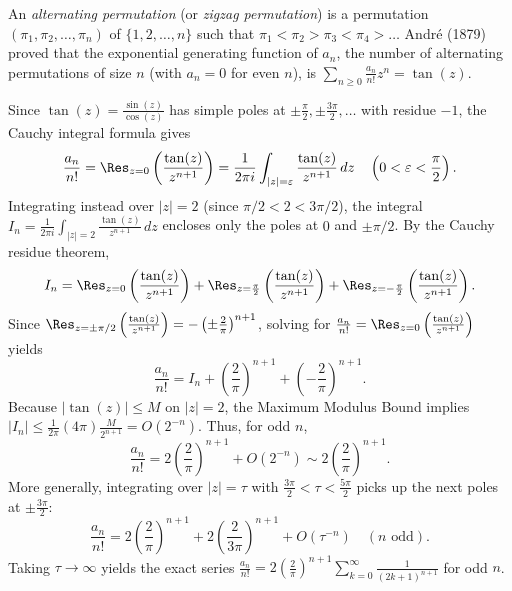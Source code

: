 \begin{example}
    An \emph{alternating permutation} (or \emph{zigzag permutation}) is a permutation \((\pi_1, \pi_2, \dots, \pi_n)\) of \(\{1, 2, \dots, n\}\) such that \(\pi_1 < \pi_2 > \pi_3 < \pi_4 > \dots\)
    André (1879) proved that the exponential generating function of \(a_n\), the number of alternating permutations of size \(n\) (with \(a_n = 0\) for even \(n\)), is \(\sum_{n \ge 0} \frac{a_n}{n!} z^n = \tan(z)\).

    Since \(\tan(z) = \frac{\sin(z)}{\cos(z)}\) has simple poles at \(\pm \frac{\pi}{2}, \pm \frac{3\pi}{2}, \dots\) with residue \(-1\), the Cauchy integral formula gives
    \[
        \frac{a_n}{n!} = \Res_{z=0}\left( \frac{\tan(z)}{z^{n+1}} \right) = \frac{1}{2\pi i} \int_{|z|=\varepsilon} \frac{\tan(z)}{z^{n+1}} \, dz \quad \left(0 < \varepsilon < \frac{\pi}{2}\right).
    \]
    Integrating instead over \(|z| = 2\) (since \(\pi/2 < 2 < 3\pi/2\)), the integral \(I_n = \frac{1}{2\pi i} \int_{|z|=2} \frac{\tan(z)}{z^{n+1}} \, dz\) encloses only the poles at \(0\) and \(\pm \pi/2\).
    By the Cauchy residue theorem,
    \[
        I_n = \Res_{z=0}\left( \frac{\tan(z)}{z^{n+1}} \right) + \Res_{z=\frac{\pi}{2}}\left( \frac{\tan(z)}{z^{n+1}} \right) + \Res_{z=-\frac{\pi}{2}}\left( \frac{\tan(z)}{z^{n+1}} \right).
    \]
    Since \(\Res_{z = \pm \pi/2} \left( \frac{\tan(z)}{z^{n+1}} \right) = -\left(\pm \frac{2}{\pi}\right)^{n+1}\), solving for \(\frac{a_n}{n!} = \Res_{z=0}\left( \frac{\tan(z)}{z^{n+1}} \right)\) yields
    \[
        \frac{a_n}{n!} = I_n + \left( \frac{2}{\pi} \right)^{n+1} + \left( -\frac{2}{\pi} \right)^{n+1}.
    \]
    Because \(|\tan(z)| \le M\) on \(|z| = 2\), the Maximum Modulus Bound implies \(|I_n| \le \frac{1}{2\pi}(4\pi) \frac{M}{2^{n+1}} = O(2^{-n})\).
    Thus, for odd \(n\),
    \[
        \frac{a_n}{n!} = 2\left( \frac{2}{\pi} \right)^{n+1} + O(2^{-n}) \sim 2\left( \frac{2}{\pi} \right)^{n+1}.
    \]
    More generally, integrating over \(|z| = \tau\) with \(\frac{3\pi}{2} < \tau < \frac{5\pi}{2}\) picks up the next poles at \(\pm \frac{3\pi}{2}\):
    \[
        \frac{a_n}{n!} = 2\left( \frac{2}{\pi} \right)^{n+1} + 2\left( \frac{2}{3\pi} \right)^{n+1} + O(\tau^{-n}) \quad (n \text{ odd}).
    \]
    Taking \(\tau \to \infty\) yields the exact series \(\frac{a_n}{n!} = 2\left( \frac{2}{\pi} \right)^{n+1} \sum_{k=0}^{\infty} \frac{1}{(2k + 1)^{n+1}}\) for odd \(n\).

\end{example}

